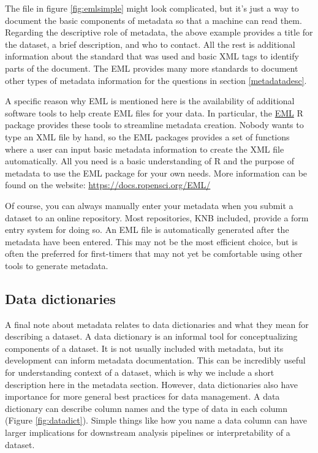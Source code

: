 \documentclass[
]{book}
\begin{document}
The file in figure \ref{fig:emlsimple} might look complicated, but it's just a way to document the basic components of metadata so that a machine can read them. Regarding the descriptive role of metadata, the above example provides a title for the dataset, a brief description, and who to contact. All the rest is additional information about the standard that was used and basic XML tags to identify parts of the document. The EML provides many more standards to document other types of metadata information for the questions in section \ref{metadatadesc}.

A specific reason why EML is mentioned here is the availability of additional software tools to help create EML files for your data. In particular, the \href{https://docs.ropensci.org/EML/}{EML} R package provides these tools to streamline metadata creation. Nobody wants to type an XML file by hand, so the EML packages provides a set of functions where a user can input basic metadata information to create the XML file automatically. All you need is a basic understanding of R and the purpose of metadata to use the EML package for your own needs. More information can be found on the website: \url{https://docs.ropensci.org/EML/}

Of course, you can always manually enter your metadata when you submit a dataset to an online repository. Most repositories, KNB included, provide a form entry system for doing so. An EML file is automatically generated after the metadata have been entered. This may not be the most efficient choice, but is often the preferred for first-timers that may not yet be comfortable using other tools to generate metadata.

\subsection{Data dictionaries}\label{dict}

A final note about metadata relates to data dictionaries and what they mean for describing a dataset. A data dictionary is an informal tool for conceptualizing components of a dataset. It is not usually included with metadata, but its development can inform metadata documentation. This can be incredibly useful for understanding context of a dataset, which is why we include a short description here in the metadata section. However, data dictionaries also have importance for more general best practices for data management. A data dictionary can describe column names and the type of data in each column (Figure \ref{fig:datadict}). Simple things like how you name a data column can have larger implications for downstream analysis pipelines or interpretability of a dataset.
\end{document}
